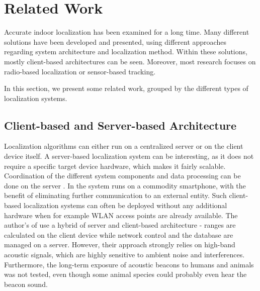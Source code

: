 
\chapter{Related Work} %

\label{Chapter2} %
Accurate indoor localization has been examined for a long time. Many different solutions have been developed and presented, using different approaches regarding system architecture and localization method. Within these solutions, mostly client-based architectures can be seen. Moreover, most research focuses on radio-based localization or sensor-based tracking.

In this section, we present some related work, grouped by the different types of localization systems.


\section{Client-based and Server-based Architecture}
Localization algorithms can either run on a centralized server or on the client device itself. A server-based localization system can be interesting, as it does not require a specific target device hardware, which makes it fairly scalable. Coordination of the different system components and data processing can be done on the server \cite{Delmastro}.
In \cite{Carrera} the system runs on a commodity smartphone, with the benefit of eliminating further communication to an external entity. Such client-based localization systems can often be deployed without any additional hardware when for example WLAN access points are already available. The author's of \cite{Guoguo} use a hybrid of server and client-based architecture - ranges are calculated on the client device while network control and the database are managed on a server. However, their approach strongly relies on high-band acoustic signals, which are highly sensitive to ambient noise and interferences. Furthermore, the long-term exposure of acoustic beacons to humans and animals was not tested, even though some animal species could probably even hear the beacon sound.

